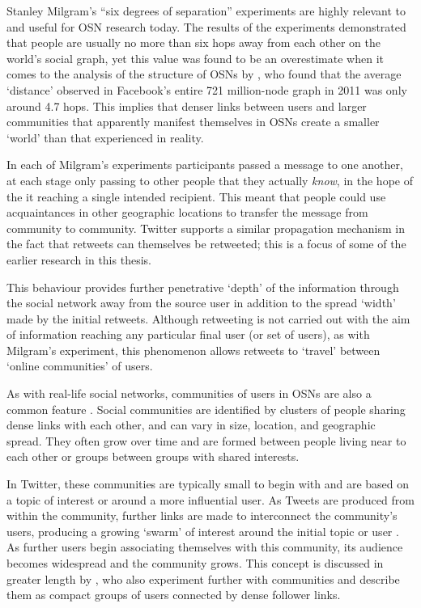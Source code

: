 Stanley Milgram's ``six degrees of separation'' \cite{milgram67} experiments are highly relevant to and useful for OSN research today. The results of the experiments demonstrated that people are usually no more than six hops away from each other on the world's social graph, yet this value was found to be an overestimate when it comes to the analysis of the structure of OSNs by \cite{backstrom11}, who found that the average `distance' observed in Facebook's entire 721 million-node graph in 2011 was only around 4.7 hops. This implies that denser links between users and larger communities that apparently manifest themselves in OSNs create a smaller `world' than that experienced in reality.

In each of Milgram's experiments participants passed a message to one another, at each stage only passing to other people that they actually \textit{know}, in the hope of the it reaching a single intended recipient. This meant that people could use acquaintances in other geographic locations to transfer the message from community to community. Twitter supports a similar propagation mechanism in the fact that retweets can themselves be retweeted; this is a focus of some of the earlier research in this thesis.

This behaviour provides further penetrative `depth' of the information through the social network away from the source user in addition to the spread `width' made by the initial retweets. Although retweeting is not carried out with the aim of information reaching any particular final user (or set of users), as with Milgram's experiment, this phenomenon allows retweets to `travel' between `online communities' of users.

As with real-life social networks, communities of users in OSNs are also a common feature \cite{ugander11}. Social communities are identified by clusters of people sharing dense links with each other, and can vary in size, location, and geographic spread. They often grow over time and are formed between people living near to each other or groups between groups with shared interests.

In Twitter, these communities are typically small to begin with and are based on a topic of interest or around a more influential user. As Tweets are produced from within the community, further links are made to interconnect the community's users, producing a growing `swarm' of interest around the initial topic or user \cite{java07}. As further users begin associating themselves with this community, its audience becomes widespread and the community grows. This concept is discussed in greater length by \cite{java07}, who also experiment further with communities and describe them as compact groups of users connected by dense follower links.

